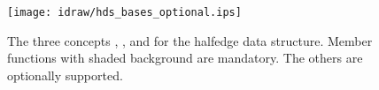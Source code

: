 \begin{ccTexOnly}
    \begin{figure}
        \begin{center}
          \parbox{\textwidth}{%
              \texttt{[image: idraw/hds\_bases\_optional.ips]}%
          }
        \end{center}
        \caption{The three concepts \protect{}, 
          \protect{}, and 
          \protect{} for the halfedge data structure. Member
          functions with shaded background are mandatory. The others
          are optionally supported.}
        \label{figureOptionalBasesMethods}
    \end{figure}
\end{ccTexOnly}

